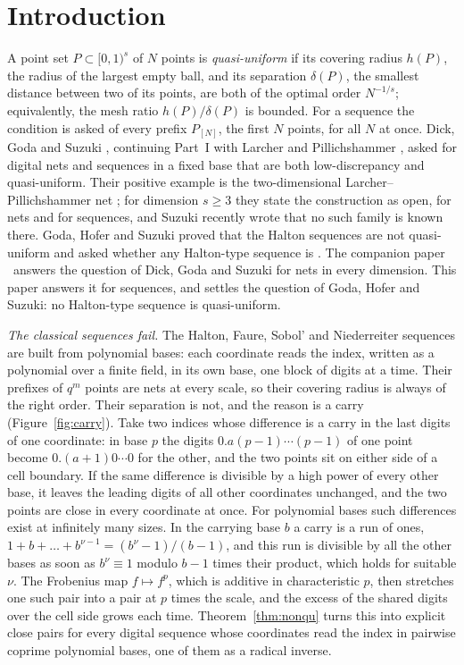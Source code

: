 %
%
%
%
\section{Introduction}\label{sec:intro}
A point set $P\subset[0,1)^s$ of $N$ points is \emph{quasi-uniform} if its covering radius $h(P)$, the radius of the largest empty ball, and its separation $\delta(P)$, the smallest distance between two of its points, are both of the optimal order $N^{-1/s}$; equivalently, the mesh ratio $h(P)/\delta(P)$ is bounded. For a sequence the condition is asked of every prefix $P_{[N]}$, the first $N$ points, for all $N$ at once. Dick, Goda and Suzuki \cite{DGS2}, continuing Part~I with Larcher and Pillichshammer \cite{DGLPS1}, asked for digital nets and sequences in a fixed base that are both low-discrepancy and quasi-uniform. Their positive example is the two-dimensional Larcher--Pillichshammer net \cite{LP01}; for dimension $s\ge3$ they state the construction as open, for nets and for sequences, and Suzuki \cite{Suz26} recently wrote that no such family is known there. Goda, Hofer and Suzuki proved that the Halton sequences are not quasi-uniform and asked whether any Halton-type sequence is \cite[Open Problem~2]{GHS26}. The companion paper \cite{Gru26geo}%
\ answers the question of Dick, Goda and Suzuki for nets in every dimension. This paper answers it for sequences, and settles the question of Goda, Hofer and Suzuki: no Halton-type sequence is quasi-uniform.

\emph{The classical sequences fail.} The Halton, Faure, Sobol' and Niederreiter sequences are built from polynomial bases: each coordinate reads the index, written as a polynomial over a finite field, in its own base, one block of digits at a time. Their prefixes of $q^m$ points are nets at every scale, so their covering radius is always of the right order. Their separation is not, and the reason is a carry (Figure~\ref{fig:carry}). Take two indices whose difference is a carry in the last digits of one coordinate: in base $p$ the digits $0.a(p-1)\cdots(p-1)$ of one point become $0.(a+1)0\cdots0$ for the other, and the two points sit on either side of a cell boundary. If the same difference is divisible by a high power of every other base, it leaves the leading digits of all other coordinates unchanged, and the two points are close in every coordinate at once. For polynomial bases such differences exist at infinitely many sizes. In the carrying base $b$ a carry is a run of ones, $1+b+\dots+b^{\nu-1}=(b^\nu-1)/(b-1)$, and this run is divisible by all the other bases as soon as $b^\nu\equiv1$ modulo $b-1$ times their product, which holds for suitable $\nu$. The Frobenius map $f\mapsto f^p$, which is additive in characteristic $p$, then stretches one such pair into a pair at $p$ times the scale, and the excess of the shared digits over the cell side grows each time. Theorem~\ref{thm:nonqu} turns this into explicit close pairs for every digital sequence whose coordinates read the index in pairwise coprime polynomial bases, one of them as a radical inverse.

